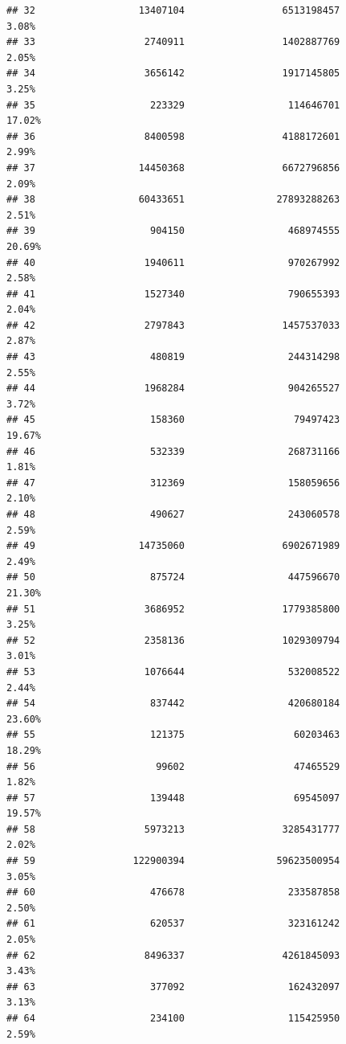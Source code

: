 \documentclass[
  12pt,
]{article}
\begin{document}
\begin{verbatim}
## 32                  13407104                 6513198457                3.08%
## 33                   2740911                 1402887769                2.05%
## 34                   3656142                 1917145805                3.25%
## 35                    223329                  114646701               17.02%
## 36                   8400598                 4188172601                2.99%
## 37                  14450368                 6672796856                2.09%
## 38                  60433651                27893288263                2.51%
## 39                    904150                  468974555               20.69%
## 40                   1940611                  970267992                2.58%
## 41                   1527340                  790655393                2.04%
## 42                   2797843                 1457537033                2.87%
## 43                    480819                  244314298                2.55%
## 44                   1968284                  904265527                3.72%
## 45                    158360                   79497423               19.67%
## 46                    532339                  268731166                1.81%
## 47                    312369                  158059656                2.10%
## 48                    490627                  243060578                2.59%
## 49                  14735060                 6902671989                2.49%
## 50                    875724                  447596670               21.30%
## 51                   3686952                 1779385800                3.25%
## 52                   2358136                 1029309794                3.01%
## 53                   1076644                  532008522                2.44%
## 54                    837442                  420680184               23.60%
## 55                    121375                   60203463               18.29%
## 56                     99602                   47465529                1.82%
## 57                    139448                   69545097               19.57%
## 58                   5973213                 3285431777                2.02%
## 59                 122900394                59623500954                3.05%
## 60                    476678                  233587858                2.50%
## 61                    620537                  323161242                2.05%
## 62                   8496337                 4261845093                3.43%
## 63                    377092                  162432097                3.13%
## 64                    234100                  115425950                2.59%

\end{verbatim}
\end{document}
